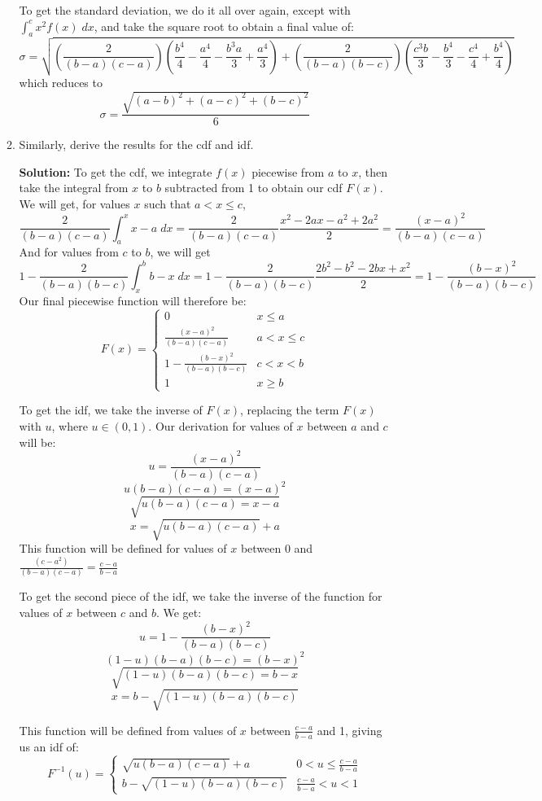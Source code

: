 \documentclass[11pt]{article} %
\newcommand{\inv}{^{-1}}
\begin{document}
\begin{enumerate}
\begin{enumerate}
To get the standard deviation, we do it all over again, except with $\int_a^cx^2f(x)\;dx$, and take the square root to obtain a final value of:
$$\sigma = \sqrt{\left(\frac{2}{(b-a)(c-a)}\right)\left(\frac{b^4}{4} - \frac{a^4}{4} - \frac{b^3a}{3} + \frac{a^4}{3}\right)
+ \left(\frac{2}{(b-a)(b-c)}\right)\left(\frac{c^3b}{3}-\frac{b^4}{3} -\frac{c^4}{4}+\frac{b^4}{4}\right)}$$
which reduces to
$$\sigma = \frac{\sqrt{(a-b)^2 + (a-c)^2 + (b-c)^2}}{6}$$

\item Similarly, derive the results for the cdf and idf.

{\bf Solution:} To get the cdf, we integrate $f(x)$ piecewise from $a$ to $x$, then take the integral from $x$ to $b$ subtracted from 1 to obtain our cdf $F(x)$.  We will get, for values $x$ such that $a< x\le c$,
$$\frac{2}{(b-a)(c-a)}\int_a^xx-a\;dx = \frac{2}{(b-a)(c-a)}\frac{x^2 -2ax - a^2 + 2a^2}{2} = \frac{(x-a)^2}{(b-a)(c-a)}$$
And for values from $c$ to $b$, we will get
$$1-\frac{2}{(b-a)(b-c)}\int_x^bb-x \;dx = 1- \frac{2}{(b-a)(b-c)}\frac{2b^2 -b^2 -2bx + x^2}{2} = 1 - \frac{(b-x)^2}{(b-a)(b-c)}$$
Our final piecewise function will therefore be:
$$F(x) = \left\{\begin{array}{ll}
0 & x \le a\\
\frac{(x-a)^2}{(b-a)(c-a)} & a < x \le c \\
1 - \frac{(b-x)^2}{(b-a)(b-c)} & c < x < b \\
1 & x \ge b
\end{array}\right.$$

\newpage

To get the idf, we take the inverse of $F(x)$, replacing the term $F(x)$ with $u$, where $u \in (0,1)$.  Our derivation for values of $x$ between $a$ and $c$ will be:
$$u = \frac{(x-a)^2}{(b-a)(c-a)}$$
$$u(b-a)(c-a) = (x-a)^2$$
$$\sqrt{u(b-a)(c-a) = x-a}$$
$$x = \sqrt{u(b-a)(c-a)} + a$$
This function will be defined for values of $x$ between 0 and $\frac{(c-a^2)}{(b-a)(c-a)} = \frac{c-a}{b-a}$

To get the second piece of the idf, we take the inverse of the function for values of $x$ between $c$ and $b$.  We get:
$$u  = 1 - \frac{(b-x)^2}{(b-a)(b-c)}$$
$$(1-u)(b-a)(b-c) = (b-x)^2$$
$$\sqrt{(1-u)(b-a)(b-c) = b-x}$$
$$x = b - \sqrt{(1-u)(b-a)(b-c)}$$

This function will be defined from values of $x$ between $\frac{c-a}{b-a}$ and 1, giving us an idf of:
$$F\inv(u) = \left\{\begin{array}{ll}
\sqrt{u(b-a)(c-a)} + a & 0  < u \le \frac{c-a}{b-a}\\
b - \sqrt{(1-u)(b-a)(b-c)} & \frac{c-a}{b-a} < u < 1 
\end{array}\right.$$

\end{enumerate}

\end{enumerate}
\end{document}
